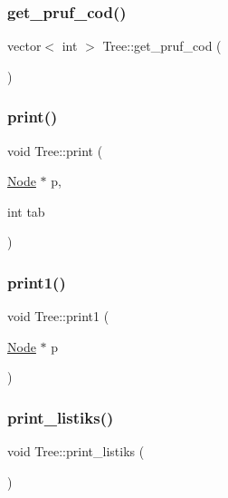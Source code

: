 \mbox{\label{class_tree_a723ce7ab4f1030e95a959e11a22833e7}} 
\subsubsection{\texorpdfstring{get\+\_\+pruf\+\_\+cod()}{get\_pruf\_cod()}}
{\footnotesize\ttfamily vector$<$ int $>$ Tree\+::get\+\_\+pruf\+\_\+cod (\begin{DoxyParamCaption}{ }\end{DoxyParamCaption})}

\mbox{\label{class_tree_ad041f83eddd83c74f689dae8283c054f}} 
\subsubsection{\texorpdfstring{print()}{print()}}
{\footnotesize\ttfamily void Tree\+::print (\begin{DoxyParamCaption}\item[{\mbox{\hyperlink{class_node}{Node}} $\ast$}]{p,  }\item[{int}]{tab }\end{DoxyParamCaption})}

\mbox{\label{class_tree_acc690f24219bb3816a7552b443bfb02b}} 
\subsubsection{\texorpdfstring{print1()}{print1()}}
{\footnotesize\ttfamily void Tree\+::print1 (\begin{DoxyParamCaption}\item[{\mbox{\hyperlink{class_node}{Node}} $\ast$}]{p }\end{DoxyParamCaption})}

\mbox{\label{class_tree_ac2c37627e5e75085896379f2855d4306}} 
\subsubsection{\texorpdfstring{print\+\_\+listiks()}{print\_listiks()}}
{\footnotesize\ttfamily void Tree\+::print\+\_\+listiks (\begin{DoxyParamCaption}{ }\end{DoxyParamCaption})}

